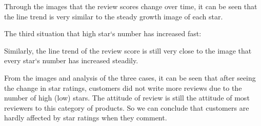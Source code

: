\documentclass[12pt]{article}
\begin{document}
Through the images that the review scores change over time, it can be seen that the line trend is very similar to the steady growth image of each star.
\par
The third situation that high star`s number has increased fast:
\par\quad\par\quad\par\quad\par\quad\par\quad\par\quad\par\quad\par\quad\par\quad\par\quad\par
\par\quad\par\quad\par\quad\par\quad\par\quad\par\quad\par\quad\par\quad\par\quad\par\quad\par
Similarly, the line trend of the review score is still very close to the image that every star`s number has increased steadily.
\par
From the images and analysis of the three cases, it can be seen that after seeing the change in star ratings, customers did not write more reviews due to the number of high (low) stars. The attitude of review is still the attitude of most reviewers to this category of products. So we can conclude that customers are hardly affected by star ratings when they comment.
\end{document}
